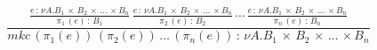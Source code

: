 \begin{equation}
\frac { \frac { e\, :\, \nu A.B_{ 1 }\, \times \, B_{ 2 }\, \times \, \dots \, \times B_{ n } }{ \pi _{ 1 }\, (e)\, :\, B_{ 1 } } \, \frac { e\, :\, \nu A.B_{ 1 }\, \times \, B_{ 2 }\, \times \, \dots \, \times B_{ n } }{ \pi _{ 2 }\, (e)\, :\, B_{ 2 } } \, \cdots \, \frac { e\, :\, \nu A.B_{ 1 }\, \times \, B_{ 2 }\, \times \, \dots \, \times B_{ n } }{ \pi _{ n }\, (e)\, :\, B_{ n } }  }{ mkc\, ({ \pi  }_{ 1 }(e))\, ({ \pi  }_{ 2 }(e))\, \dots \, ({ \pi  }_{ n }(e))\, :\, \nu A.B_{ 1 }\, \times \, B_{ 2 }\, \times \, \dots \, \times B_{ n } } 
\end{equation}